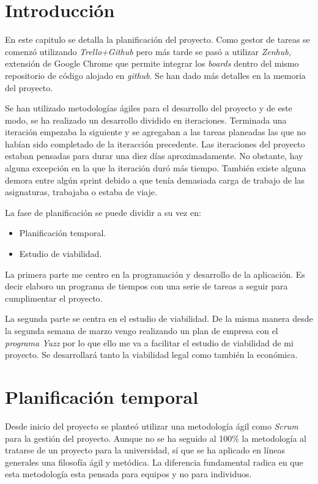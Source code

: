 
\section{Introducción}\label{introduccion-plan}
En este capitulo se detalla la planificación del proyecto. Como gestor de tareas se comenzó utilizando \emph{Trello+Github} pero más tarde se pasó a utilizar \emph{Zenhub,} extensión de Google Chrome que permite integrar los \emph{boards} dentro del mismo repositorio de código alojado en \emph{github}. Se han dado más detalles en la memoria del proyecto.

Se han utilizado metodologías ágiles para el desarrollo del proyecto y de este modo, se ha realizado un desarrollo dividido en iteraciones. Terminada una iteración empezaba la siguiente y se agregaban a las tareas planeadas las que no habían sido completado de la iteracción precedente. Las iteraciones del proyecto estaban pensadas para durar una diez días aproximadamente. No obstante, hay alguna excepción en la que la iteración duró más tiempo. También existe alguna demora entre algún sprint debido a que tenía demasiada carga de trabajo de las asignaturas, trabajaba o estaba de viaje. 

La fase de planificación se puede dividir a su vez en:

\begin{itemize}
\tightlist
\item
  Planificación temporal.
\item
  Estudio de viabilidad.
\end{itemize} 

La primera parte me centro en la programación y desarrollo de la aplicación. Es decir elaboro un programa de tiempos con una serie de tareas a seguir para cumplimentar el proyecto.

La segunda parte se centra en el estudio de viabilidad. De la misma manera desde la segunda semana de marzo vengo realizando un plan de empresa con el \emph{programa Yuzz} por lo que ello me va a facilitar el estudio de viabilidad de mi proyecto. Se desarrollará tanto la viabilidad legal como también la económica. 


\section{Planificación temporal}\label{planificacion-temporal}
Desde inicio del proyecto se planteó utilizar una metodología ágil como
\emph{Scrum} para la gestión del proyecto. Aunque no se ha seguido al 100\% la
metodología al tratarse de un proyecto para la universidad, sí que se ha aplicado
en líneas generales una filosofía ágil y metódica. La diferencia fundamental radica en que esta metodología esta pensada para equipos y no para individuos.

